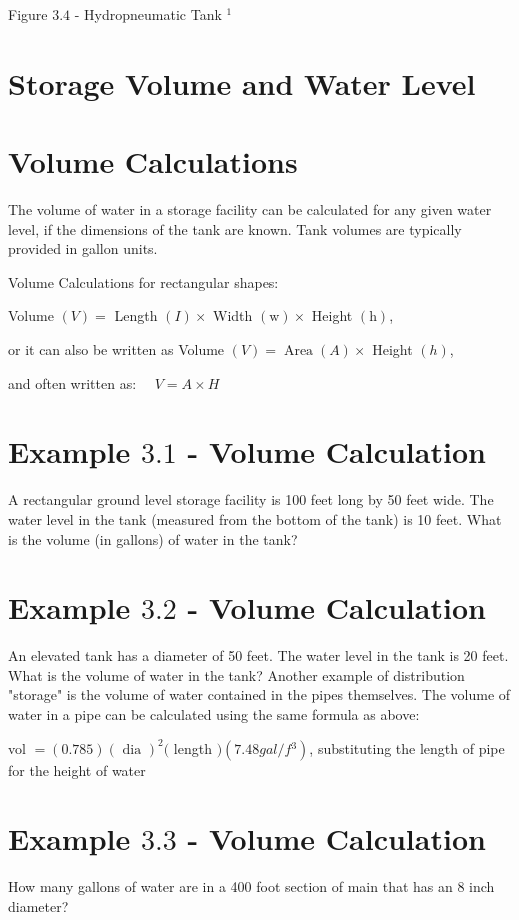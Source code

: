 \documentclass[10pt]{article}
\begin{document}
Figure $3.4$ - Hydropneumatic Tank ${ }^{1}$

\section{Storage Volume and Water Level}
\section{Volume Calculations}
The volume of water in a storage facility can be calculated for any given water level, if the dimensions of the tank are known. Tank volumes are typically provided in gallon units.

Volume Calculations for rectangular shapes:

Volume $(V)=$ Length $(I) \times$ Width $(\mathrm{w}) \times$ Height $(\mathrm{h})$,

or it can also be written as Volume $(V)=\operatorname{Area}(A) \times$ Height $(h)$,

and often written as: $\quad V=A \times H$

\section{Example $3.1$ - Volume Calculation}
A rectangular ground level storage facility is 100 feet long by 50 feet wide. The water level in the tank (measured from the bottom of the tank) is 10 feet. What is the volume (in gallons) of water in the tank?

\section{Example $3.2$ - Volume Calculation}
An elevated tank has a diameter of 50 feet. The water level in the tank is 20 feet. What is the volume of water in the tank? Another example of distribution "storage" is the volume of water contained in the pipes themselves. The volume of water in a pipe can be calculated using the same formula as above:

vol $=(0.785)(\text { dia })^{2}($ length $)\left(7.48 g a l / f{ }^{3}\right)$, substituting the length of pipe for the height of water

\section{Example $3.3$ - Volume Calculation}
How many gallons of water are in a 400 foot section of main that has an 8 inch diameter?
\end{document}
